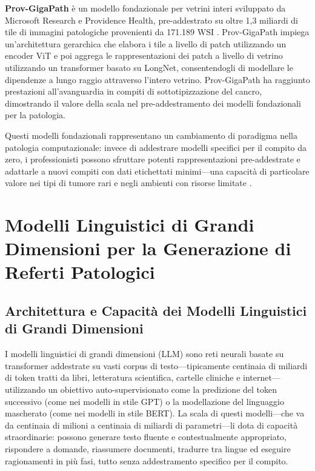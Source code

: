 \textbf{Prov-GigaPath} è un modello fondazionale per vetrini interi sviluppato da Microsoft Research e Providence Health, pre-addestrato su oltre 1,3 miliardi di tile di immagini patologiche provenienti da 171.189 WSI \cite{xu2024}. Prov-GigaPath impiega un'architettura gerarchica che elabora i tile a livello di patch utilizzando un encoder ViT e poi aggrega le rappresentazioni dei patch a livello di vetrino utilizzando un transformer basato su LongNet, consentendogli di modellare le dipendenze a lungo raggio attraverso l'intero vetrino. Prov-GigaPath ha raggiunto prestazioni all'avanguardia in compiti di sottotipizzazione del cancro, dimostrando il valore della scala nel pre-addestramento dei modelli fondazionali per la patologia.

Questi modelli fondazionali rappresentano un cambiamento di paradigma nella patologia computazionale: invece di addestrare modelli specifici per il compito da zero, i professionisti possono sfruttare potenti rappresentazioni pre-addestrate e adattarle a nuovi compiti con dati etichettati minimi---una capacità di particolare valore nei tipi di tumore rari e negli ambienti con risorse limitate \cite{song2023}.

\section{Modelli Linguistici di Grandi Dimensioni per la Generazione di Referti Patologici}
\label{sec:ch4_llm}

\subsection{Architettura e Capacità dei Modelli Linguistici di Grandi Dimensioni}

I modelli linguistici di grandi dimensioni (LLM) sono reti neurali basate su transformer addestrate su vasti corpus di testo---tipicamente centinaia di miliardi di token tratti da libri, letteratura scientifica, cartelle cliniche e internet---utilizzando un obiettivo auto-supervisionato come la predizione del token successivo (come nei modelli in stile GPT) o la modellazione del linguaggio mascherato (come nei modelli in stile BERT). La scala di questi modelli---che va da centinaia di milioni a centinaia di miliardi di parametri---li dota di capacità straordinarie: possono generare testo fluente e contestualmente appropriato, rispondere a domande, riassumere documenti, tradurre tra lingue ed eseguire ragionamenti in più fasi, tutto senza addestramento specifico per il compito.


